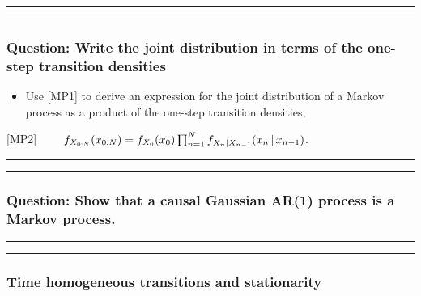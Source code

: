 \documentclass[]{article}
\providecommand{\tightlist}{%
  \setlength{\itemsep}{0pt}\setlength{\parskip}{0pt}}
\begin{document}
\begin{center}\rule{0.5\linewidth}{\linethickness}\end{center}

\begin{center}\rule{0.5\linewidth}{\linethickness}\end{center}

\subsubsection{Question: Write the joint distribution in terms of the
one-step transition
densities}\label{question-write-the-joint-distribution-in-terms-of-the-one-step-transition-densities}

\begin{itemize}
\tightlist
\item
  Use {[}MP1{]} to derive an expression for the joint distribution of a
  Markov process as a product of the one-step transition densities,
\end{itemize}

{[}MP2{]}
\(\quad\quad f_{X_{0:N}}(x_{0:N}) = f_{X_0}(x_0)\prod_{n=1}^N f_{X_n|X_{n-1}}(x_n{\, | \,} x_{n-1})\).

\begin{center}\rule{0.5\linewidth}{\linethickness}\end{center}

\begin{center}\rule{0.5\linewidth}{\linethickness}\end{center}

\subsubsection{Question: Show that a causal Gaussian AR(1) process is a
Markov
process.}\label{question-show-that-a-causal-gaussian-ar1-process-is-a-markov-process.}

\begin{center}\rule{0.5\linewidth}{\linethickness}\end{center}

\begin{center}\rule{0.5\linewidth}{\linethickness}\end{center}

\subsubsection{Time homogeneous transitions and
stationarity}\label{time-homogeneous-transitions-and-stationarity}
\end{document}
